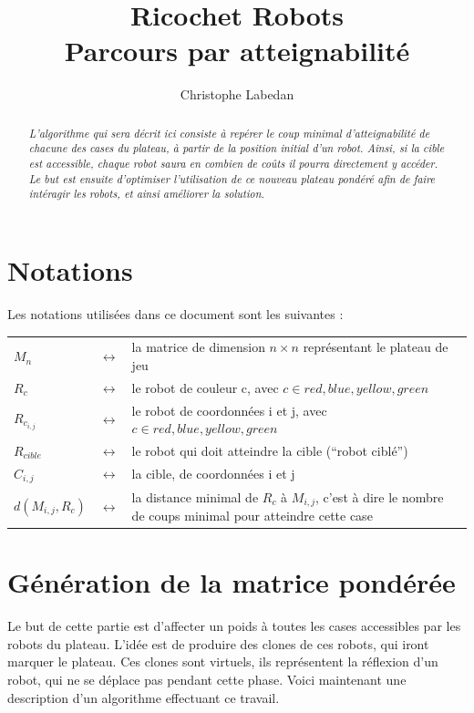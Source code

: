 \documentclass[a4paper,11pt]{article}
\author{Christophe Labedan}
\title{Ricochet Robots\\Parcours par atteignabilit\'e}
\date{}
\newcommand{\Abstract}[1]{\begin{abstract}\textit{#1}\end{abstract}\vspace{-1cm}}
\begin{document}
\maketitle
\thispagestyle{empty}
\pagenumbering{}
\vfill
\Abstract{
 L'algorithme qui sera d\'ecrit ici consiste \`a rep\'erer le coup minimal d'atteignabilit\'e de chacune des cases du plateau, \`a partir de la position initial d'un robot. Ainsi, si la cible est accessible, chaque robot saura en combien de co\^uts il pourra directement y acc\'eder. Le but est ensuite d'optimiser l'utilisation de ce nouveau plateau pond\'er\'e afin de faire int\'eragir les robots, et ainsi am\'eliorer la solution.
}
\vfill
\newpage
{}
\section{Notations}
Les notations utilis\'ees dans ce document sont les suivantes :\\

\begin{tabular}{lcl}
$M_n$ & $\leftrightarrow$ & la matrice de dimension $n \times n$ repr\'esentant le plateau de jeu\\
$R_c$ & $\leftrightarrow$ & le robot de couleur c, avec $c \in {red, blue, yellow, green}$\\
$R_{c_{i,j}}$ & $\leftrightarrow$ & le robot de coordonn\'ees i  et j, avec $c \in {red, blue, yellow, green}$\\
$R_{cible}$ & $\leftrightarrow$ & le robot qui doit atteindre la cible (``robot cibl\'e'')\\
$C_{i,j}$ & $\leftrightarrow$ & la cible, de coordonn\'ees i et j\\
$d(M_{i,j},R_c)$ & $\leftrightarrow$ & la distance minimal de $R_c$ \`a $M_{i,j}$, c'est \`a dire le nombre de coups minimal pour atteindre cette case\\

\end{tabular}

\section{G\'en\'eration de la matrice pond\'er\'ee}
Le but de cette partie est d'affecter un poids \`a toutes les cases accessibles par les robots du plateau. L'id\'ee est de produire des clones de ces robots, qui iront marquer le plateau. Ces clones sont virtuels, ils repr\'esentent la r\'eflexion d'un robot, qui ne se d\'eplace pas pendant cette phase. Voici maintenant une description d'un algorithme effectuant ce travail.
\end{document}
